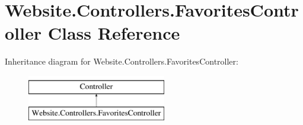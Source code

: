 \hypertarget{class_website_1_1_controllers_1_1_favorites_controller}{}\section{Website.\+Controllers.\+Favorites\+Controller Class Reference}
\label{class_website_1_1_controllers_1_1_favorites_controller}
Inheritance diagram for Website.\+Controllers.\+Favorites\+Controller\+:\begin{figure}[H]
\begin{center}
\leavevmode
\includegraphics[height=2.000000cm]{class_website_1_1_controllers_1_1_favorites_controller}
\end{center}
\end{figure}
